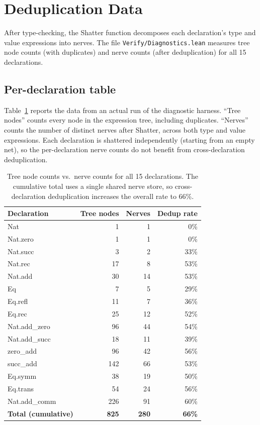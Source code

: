 \section{Deduplication Data}\label{sec:deduplication}\label{app:dedup}

After type-checking, the Shatter function decomposes each declaration's type and value expressions into nerves.  The file \texttt{Verify/Diagnostics.lean} measures tree node counts (with duplicates) and nerve counts (after deduplication) for all 15 declarations.

\subsection{Per-declaration table}

Table~\ref{tab:dedup} reports the data from an actual run of the diagnostic harness.  ``Tree nodes'' counts every node in the expression tree, including duplicates.  ``Nerves'' counts the number of distinct nerves after Shatter, across both type and value expressions.  Each declaration is shattered independently (starting from an empty net), so the per-declaration nerve counts do not benefit from cross-declaration deduplication.

\begin{table}[H]
\centering
\begin{tabular}{@{}lrrr@{}}
\toprule
Declaration & Tree nodes & Nerves & Dedup rate \\
\midrule
Nat & 1 & 1 & 0\% \\
Nat.zero & 1 & 1 & 0\% \\
Nat.succ & 3 & 2 & 33\% \\
Nat.rec & 17 & 8 & 53\% \\
Nat.add & 30 & 14 & 53\% \\
Eq & 7 & 5 & 29\% \\
Eq.refl & 11 & 7 & 36\% \\
Eq.rec & 25 & 12 & 52\% \\
Nat.add\_zero & 96 & 44 & 54\% \\
Nat.add\_succ & 18 & 11 & 39\% \\
zero\_add & 96 & 42 & 56\% \\
succ\_add & 142 & 66 & 53\% \\
Eq.symm & 38 & 19 & 50\% \\
Eq.trans & 54 & 24 & 56\% \\
Nat.add\_comm & 226 & 91 & 60\% \\
\midrule
\textbf{Total (cumulative)} & \textbf{825} & \textbf{280} & \textbf{66\%} \\
\bottomrule
\end{tabular}
\caption{Tree node counts vs.\ nerve counts for all 15 declarations.  The cumulative total uses a single shared nerve store, so cross-declaration deduplication increases the overall rate to 66\%.}
\label{tab:dedup}
\end{table}

